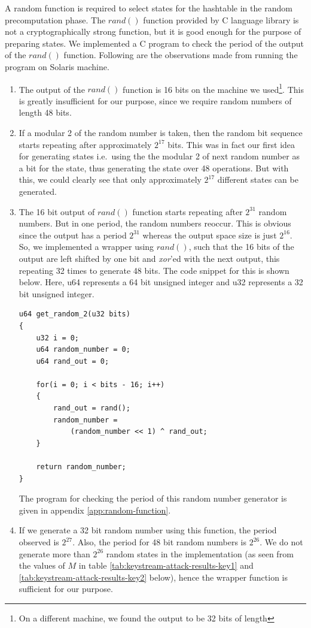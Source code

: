 A random function is required to select states for the hashtable in the random precomputation phase. The $rand()$ function provided by C language library is not a cryptographically strong function, but it is good enough for the purpose of preparing states. We implemented a C program to check the period of the output of the $rand()$ function. Following are the observations made from running the program on Solaris machine.

\begin{enumerate}
\item The output of the $rand()$ function is 16 bits on the machine we used\footnote{On a different machine, we found the output to be 32 bits of length}. This is greatly insufficient for our purpose, since we require random numbers of length 48 bits.
\item If a modular 2 of the random number is taken, then the random bit sequence starts repeating after approximately $2^{17}$ bits. This was in fact our first idea for generating states i.e.~using the the modular 2 of next random number as a bit for the state, thus generating the state over 48 operations. But with this, we could clearly see that only approximately $2^{17}$ different states can be generated.
\item The 16 bit output of $rand()$ function starts repeating after $2^{31}$ random numbers. But in one period, the random numbers reoccur. This is obvious since the output has a period $2^{31}$ whereas the output space size is just $2^{16}$. So, we implemented a wrapper using $rand()$, such that the 16 bits of the output are left shifted by one bit and \textit{xor}'ed with the next output, this repeating 32 times to generate 48 bits. The code snippet for this is shown below. Here, u64 represents a 64 bit unsigned integer and u32 represents a 32 bit unsigned integer.
\begin{lstlisting}[frame=tb]
u64 get_random_2(u32 bits)
{
	u32 i = 0;
	u64 random_number = 0;
	u64 rand_out = 0;

	for(i = 0; i < bits - 16; i++)
	{
		rand_out = rand();
		random_number = 
			(random_number << 1) ^ rand_out;
	}

	return random_number;
}
\end{lstlisting}
The program for checking the period of this random number generator is given in appendix \ref{app:random-function}.
\item If we generate a 32 bit random number using this function, the period observed is $2^{27}$. Also, the period for 48 bit random numbers is $2^{26}$. We do not generate more than $2^{26}$ random states in the implementation (as seen from the values of $M$ in table \ref{tab:keystream-attack-results-key1} and \ref{tab:keystream-attack-results-key2} below), hence the wrapper function is sufficient for our purpose.
\end{enumerate}

